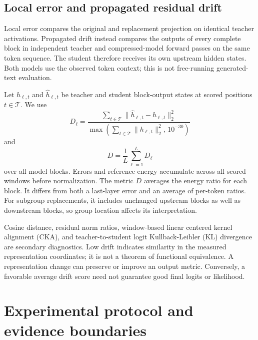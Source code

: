 \documentclass[conference]{IEEEtran}
\begin{document}
\subsection{Local error and propagated residual drift}
Local error compares the original and replacement projection on identical teacher activations. Propagated drift instead compares the outputs of every complete block in independent teacher and compressed-model forward passes on the same token sequence. The student therefore receives its own upstream hidden states. Both models use the observed token context; this is not free-running generated-text evaluation.\par\smallskip
Let $h_{\ell,t}$ and $\widehat h_{\ell,t}$ be teacher and student block-output states at scored positions $t\in\mathcal{T}$. We use
\begin{equation}D_\ell=\frac{\sum_{t\in\mathcal{T}}\|\widehat h_{\ell,t}-h_{\ell,t}\|_2^2}{\max\left(\sum_{t\in\mathcal{T}}\|h_{\ell,t}\|_2^2,\,10^{-30}\right)}\end{equation}
 and
\begin{equation}D=\frac{1}{L}\sum_{\ell=1}^{L}D_\ell\end{equation}
 over all model blocks. Errors and reference energy accumulate across all scored windows before normalization. The metric $D$ averages the energy ratio for each block. It differs from both a last-layer error and an average of per-token ratios. For subgroup replacements, it includes unchanged upstream blocks as well as downstream blocks, so group location affects its interpretation.\par\smallskip
Cosine distance, residual norm ratios, window-based linear centered kernel alignment (CKA), and teacher-to-student logit Kullback-Leibler (KL) divergence are secondary diagnostics. Low drift indicates similarity in the measured representation coordinates; it is not a theorem of functional equivalence. A representation change can preserve or improve an output metric. Conversely, a favorable average drift score need not guarantee good final logits or likelihood.\par\smallskip
\section{Experimental protocol and evidence boundaries}
\end{document}
